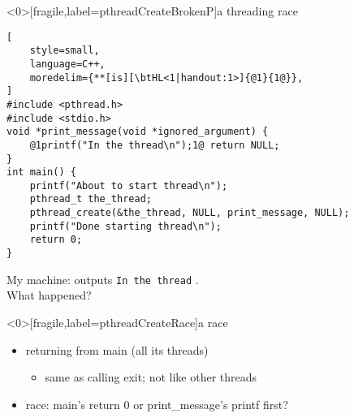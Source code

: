 \usetikzlibrary{arrows.meta}
\begin{frame}<0>[fragile,label=pthreadCreateBrokenP]{a threading race}
\begin{lstlisting}[
    style=small,
    language=C++,
    moredelim={**[is][\btHL<1|handout:1>]{@1}{1@}},
]
#include <pthread.h>
#include <stdio.h>
void *print_message(void *ignored_argument) {
    @1printf("In the thread\n");1@ return NULL;
}
int main() {
    printf("About to start thread\n");
    pthread_t the_thread;
    pthread_create(&the_thread, NULL, print_message, NULL);
    printf("Done starting thread\n");
    return 0;
}
\end{lstlisting}
My machine: outputs \texttt{In the thread} . \\
What happened?
\end{frame}

\begin{frame}<0>[fragile,label=pthreadCreateRace]{a race}
\begin{itemize}
\item returning from main  (all its threads)
    \begin{itemize}
    \item same as calling exit; not like other threads
    \end{itemize}
\item race: main's return 0 or print\_message's printf first?
\end{itemize}
\end{frame}

